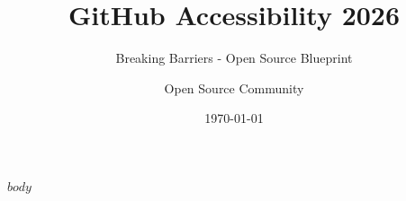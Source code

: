 \documentclass[11pt,a4paper]{report}
\title{GitHub Accessibility 2026}
\subtitle{Breaking Barriers - Open Source Blueprint}
\author{Open Source Community}
\date{\today}
\begin{document}
\maketitle
\tableofcontents
\newpage

$body$
\end{document}

